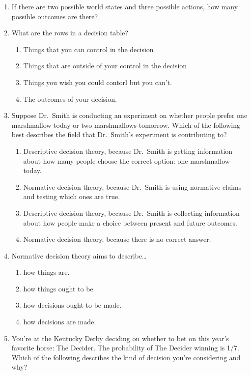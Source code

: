 \documentclass[]{tufte-book}
\providecommand{\tightlist}{%
  \setlength{\itemsep}{0pt}\setlength{\parskip}{0pt}}
\begin{document}
\begin{enumerate}
\def\labelenumi{\arabic{enumi}.}
\item
  If there are two possible world states and three possible actions, how many possible outcomes are there?
\item
  What are the rows in a decision table?

  \begin{enumerate}
  \def\labelenumii{\alph{enumii}.}
  \tightlist
  \item
    Things that you can control in the decision
  \item
    Things that are outside of your control in the decision
  \item
    Things you wish you could contorl but you can't.
  \item
    The outcomes of your decision.
  \end{enumerate}
\item
  Suppose Dr.~Smith is conducting an experiment on whether people prefer one marshmallow today or two marshmallows tomorrow. Which of the following best describes the field that Dr.~Smith's experiment is contributing to?

  \begin{enumerate}
  \def\labelenumii{\alph{enumii}.}
  \tightlist
  \item
    Descriptive decision theory, because Dr.~Smith is getting information about how many people choose the correct option: one marshmallow today.
  \item
    Normative decision theory, because Dr.~Smith is using normative claims and testing which ones are true.
  \item
    Descriptive decision theory, because Dr.~Smith is collecting information about how people make a choice between present and future outcomes.
  \item
    Normative decision theory, because there is no correct answer.
  \end{enumerate}
\item
  Normative decision theory aims to describe\ldots{}

  \begin{enumerate}
  \def\labelenumii{\alph{enumii}.}
  \tightlist
  \item
    how things are.
  \item
    how things ought to be.
  \item
    how decisions ought to be made.
  \item
    how decisions are made.
  \end{enumerate}
\item
  You're at the Kentucky Derby deciding on whether to bet on this year's favorite horse: The Decider. The probability of The Decider winning is 1/7. Which of the following describes the kind of decision you're considering and why?


\end{enumerate}
\end{document}
